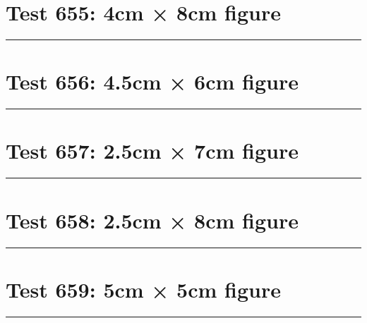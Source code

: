 \documentclass[a4paper,11pt]{article}
\begin{document}
\section*{Test 655: 4cm × 8cm figure}
\begin{swarmwrap}%
  \begin{minipage}[t]{4cm}
    \centering
    \rule{\linewidth}{8cm}
  \end{minipage}%
\end{swarmwrap}%
\swarmwrapnext
\lipsum[9]
\lipsum[10]
\lipsum[11]
\lipsum[12]
\lipsum[13]
\section*{Test 656: 4.5cm × 6cm figure}
\begin{swarmwrap}%
  \begin{minipage}[t]{4cm}
    \centering
    \rule{\linewidth}{6cm}
  \end{minipage}%
\end{swarmwrap}%
\swarmwrapnext
\lipsum[127]
\lipsum[128]
\lipsum[129]
\lipsum[130]
\lipsum[131]
\lipsum[132]
\section*{Test 657: 2.5cm × 7cm figure}
\begin{swarmwrap}%
  \begin{minipage}[t]{2cm}
    \centering
    \rule{\linewidth}{7cm}
  \end{minipage}%
\end{swarmwrap}%
\swarmwrapnext
\lipsum[112]
\lipsum[113]
\lipsum[114]
\lipsum[115]
\lipsum[116]
\lipsum[117]
\section*{Test 658: 2.5cm × 8cm figure}
\begin{swarmwrap}%
  \begin{minipage}[t]{2cm}
    \centering
    \rule{\linewidth}{8cm}
  \end{minipage}%
\end{swarmwrap}%
\swarmwrapnext
\lipsum[77]
\lipsum[78]
\lipsum[79]
\section*{Test 659: 5cm × 5cm figure}
\begin{swarmwrap}%
  \begin{minipage}[t]{5cm}
    \centering
    \rule{\linewidth}{5cm}
  \end{minipage}%
\end{swarmwrap}%
\swarmwrapnext
\lipsum[23]
\lipsum[24]
\lipsum[25]
\end{document}
